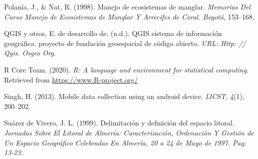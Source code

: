 \documentclass[11pt,]{article}
\begin{document}
\hypertarget{ref-polania1998manejo}{}
Polanía, J., \& Nat, R. (1998). Manejo de ecosistemas de manglar.
\emph{Memorias Del Curso Manejo de Ecosistemas de Manglar Y Arrecifes de
Coral. Bogotá}, 153--168.

\hypertarget{ref-qgis2015qgis}{}
QGIS y otros, E. de desarrollo de. (n.d.). QGIS sistema de información
geográfica. proyecto de fundación geoespacial de código abierto.
\emph{URL: Http: // Qgis. Osgeo Org}.

\hypertarget{ref-r2020r}{}
R Core Team. (2020). \emph{R: A language and environment for statistical
computing}. Retrieved from \href{\%0Ahttps://www.R-project.org/\%0A}{
https://www.R-project.org/
}

\hypertarget{ref-singh2013mobile}{}
Singh, H. (2013). Mobile data collection using an android device.
\emph{IJCST}, \emph{4}(1), 200--202.

\hypertarget{ref-suarez1999delimitacion}{}
Suárez de Vivero, J. L. (1999). Delimitación y definición del espacio
litoral. \emph{Jornadas Sobre El Litoral de Almería: Caracterización,
Ordenación Y Gestión de Un Espacio Geográfico Celebradas En Almería, 20
a 24 de Mayo de 1997. Pag: 13-23}.




\newpage
\singlespacing 
\end{document}
